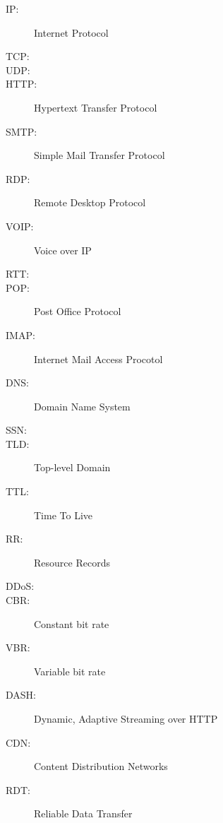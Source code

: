 
\begin{description}
	\item[IP:] Internet Protocol
	\item[TCP:] 
	\item[UDP:] 
	\item[HTTP:] Hypertext Transfer Protocol
	\item[SMTP:] Simple Mail Transfer Protocol
	\item[RDP:]	Remote Desktop Protocol
	\item[VOIP:] Voice over IP
	\item[RTT:]
	\item[POP:] Post Office Protocol
	\item[IMAP:] Internet Mail Access Procotol
	\item[DNS:] Domain Name System
	\item[SSN:]
	\item[TLD:] Top-level Domain
	\item[TTL:] Time To Live
	\item[RR:] Resource Records
	\item[DDoS:]
	\item[CBR:] Constant bit rate
	\item[VBR:] Variable bit rate
	\item[DASH:] Dynamic, Adaptive Streaming over HTTP
	\item[CDN:] Content Distribution Networks
	\item[RDT:] Reliable Data Transfer
\end{description}